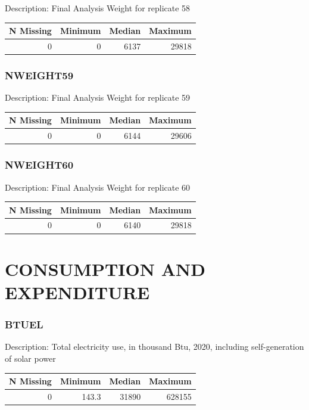 \documentclass[
]{krantz}
\begin{document}
Description: Final Analysis Weight for replicate 58

\begin{tabular}[t]{r|r|r|r}
\hline
N Missing & Minimum & Median & Maximum\\
\hline
0 & 0 & 6137 & 29818\\
\hline
\end{tabular}

\hypertarget{nweight59}{%
\subsubsection*{NWEIGHT59}\label{nweight59}}


Description: Final Analysis Weight for replicate 59

\begin{tabular}[t]{r|r|r|r}
\hline
N Missing & Minimum & Median & Maximum\\
\hline
0 & 0 & 6144 & 29606\\
\hline
\end{tabular}

\hypertarget{nweight60}{%
\subsubsection*{NWEIGHT60}\label{nweight60}}


Description: Final Analysis Weight for replicate 60

\begin{tabular}[t]{r|r|r|r}
\hline
N Missing & Minimum & Median & Maximum\\
\hline
0 & 0 & 6140 & 29818\\
\hline
\end{tabular}

\hypertarget{consumption-and-expenditure}{%
\section{CONSUMPTION AND EXPENDITURE}\label{consumption-and-expenditure}}

\hypertarget{btuel}{%
\subsubsection*{BTUEL}\label{btuel}}


Description: Total electricity use, in thousand Btu, 2020, including self-generation of solar power

\begin{tabular}[t]{r|r|r|r}
\hline
N Missing & Minimum & Median & Maximum\\
\hline
0 & 143.3 & 31890 & 628155\\
\hline
\end{tabular}
\end{document}
